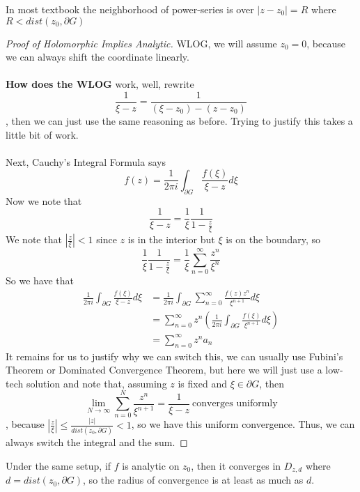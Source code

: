 \begin{remark}
    In most textbook the neighborhood of power-series is over $|z - z_0| = R$ where $R < dist(z_0, \partial G)$
\end{remark}

\begin{proof}[Proof of Holomorphic Implies Analytic]
WLOG, we will assume $z_0 = 0$, because we can always shift the coordinate linearly.\\\\
\textbf{How does the WLOG} work, well, rewrite
\[\frac{1}{\xi - z} = \frac{1}{(\xi - z_0) - (z - z_0)}\]
, then we can just use the same reasoning as before. Trying to justify this takes a little bit of work.\\\\
Next, Cauchy's Integral Formula says
\[f(z) = \frac{1}{2\pi i} \int_{\partial G} \frac{f(\xi)}{\xi - z} d\xi\]
Now we note that
\[\frac{1}{\xi - z} = \frac{1}{\xi} \frac{1}{1 - \frac{z}{\xi}}\]
We note that $|\frac{z}{\xi}| < 1$ since $z$ is in the interior but $\xi$ is on the boundary, so
\[\frac{1}{\xi} \frac{1}{1 - \frac{z}{\xi}} = \frac{1}{\xi} \sum_{n = 0}^\infty \frac{z^n}{\xi^{n}}\]
So we have that
\begin{align*}
     \frac{1}{2\pi i} \int_{\partial G} \frac{f(\xi)}{\xi - z} d\xi &= \frac{1}{2\pi i} \int_{\partial G} \sum_{n = 0}^\infty \frac{f(z) z^n}{\xi^{n+1}} d\xi\\
     &= \sum_{n = 0}^\infty z^n (\frac{1}{2\pi i} \int_{\partial G} \frac{f(\xi)}{\xi^{n+1}} d\xi) \tag*{ASSUMING We can switch integral and sum}\\
     &= \sum_{n = 0}^\infty z^n a_n
\end{align*}
It remains for us to justify why we can switch this, we can usually use Fubini's Theorem or Dominated Convergence Theorem, but here we will just use a low-tech solution and note that, assuming $z$ is fixed and $\xi \in \partial G$, then
\[\lim_{N \to \infty} \sum_{n = 0}^N \frac{z^n}{\xi^{n+1}} = \frac{1}{\xi - z}\ \text{converges uniformly} \]
, because $|\frac{z}{\xi}| \leq \frac{|z|}{dist(z_0, \partial G)} < 1$, so we have this uniform convergence. Thus, we can always switch the integral and the sum.
\end{proof}

\begin{corollary}
    Under the same setup, if $f$ is analytic on $z_0$, then it converges in $D_{z, d}$ where $d = dist(z_0, \partial G)$, so the radius of convergence is at least as much as $d$.
\end{corollary}

